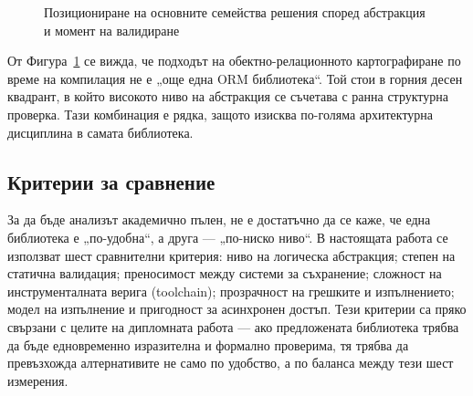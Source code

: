\begin{figure}[H]
\centering
{}
\caption{Позициониране на основните семейства решения според абстракция и момент на валидиране}
\label{fig:existing_solutions_map}
\end{figure}

От Фигура~\ref{fig:existing_solutions_map} се вижда, че подходът на обектно-релационното картографиране по време на компилация не е „още една ORM библиотека“. Той стои в горния десен квадрант, в който високото ниво на абстракция се съчетава с ранна структурна проверка. Тази комбинация е рядка, защото изисква по-голяма архитектурна дисциплина в самата библиотека.

\subsection{Критерии за сравнение}

За да бъде анализът академично пълен, не е достатъчно да се каже, че една библиотека е „по-удобна“, а друга --- „по-ниско ниво“. В настоящата работа се използват шест сравнителни критерия: ниво на логическа абстракция; степен на статична валидация; преносимост между системи за съхранение; сложност на инструменталната верига (toolchain); прозрачност на грешките и изпълнението; модел на изпълнение и пригодност за асинхронен достъп. Тези критерии са пряко свързани с целите на дипломната работа --- ако предложената библиотека трябва да бъде едновременно изразителна и формално проверима, тя трябва да превъзхожда алтернативите не само по удобство, а по баланса между тези шест измерения.

